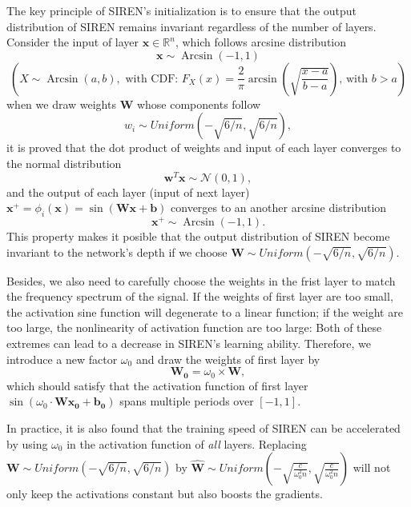 \documentclass{article}
\begin{document}
The key principle of SIREN's initialization is to ensure that the output distribution of SIREN remains invariant regardless of the number of layers.
Consider the input of layer $\mathbf{x} \in \mathbb{R}^n$, which follows arcsine distribution
$$\mathbf{x}  \sim \operatorname{Arcsin}(-1,1)$$
$$(
X \sim \operatorname{Arcsin}(a, b), \text { with CDF: } F_X(x)=\frac{2}{\pi} \arcsin \left(\sqrt{\frac{x-a}{b-a}}\right) \text {, with } b>a
)$$
when we draw weights $\mathbf{W}$ whose components follow 
$$
w_i \sim Uniform (-\sqrt{6/n}, \sqrt{6/n}),
$$
it is proved that the dot product of weights and input of each layer converges to the normal distribution 
$$
\mathbf{w}^T \mathbf{x} \sim \mathcal{N}\left(0, 1\right),
$$
and the output of each layer (input of next layer) $\mathbf{x}^+=\phi_i\left(\mathbf{x}\right)=\sin \left(\mathbf{W} \mathbf{x}+\mathbf{b}\right)$ converges to an another arcsine distribution
$$\mathbf{x}^+  \sim \operatorname{Arcsin}(-1,1).$$
This property makes it posible that the output distribution of SIREN become invariant to the network's depth if we choose $\mathbf{W} \sim Uniform (-\sqrt{6/n}, \sqrt{6/n}).$


Besides, we also need to carefully choose the weights in the frist layer to match the frequency spectrum of the signal.
If the weights of first layer are too small, the activation sine function will degenerate to a linear function; if the weight are too large, the nonlinearity of activation function are too large:  Both of these extremes can lead to a decrease in SIREN's learning ability.
Therefore, we introduce a new factor $\omega_0$  and  draw the weights of first layer by
$$
\mathbf{W_0} = \omega_0 \times \mathbf{W},
$$
which should satisfy that the activation function of first layer $\sin \left(\omega_0 \cdot \mathbf{W} \mathbf{x_0}+\mathbf{b_0}\right)$ spans multiple periods over $[-1,1]$.

In practice, it is also found that the training speed of SIREN can be accelerated by using $\omega_0$ in the activation function of \textit{all} layers.
Replacing $\mathbf{W} \sim Uniform (-\sqrt{6/n}, \sqrt{6/n})$ by
$
\widehat {\mathbf{W}} \sim Uniform\left(-\sqrt{\frac{c}{\omega_0^2 n}}, \sqrt{\frac{c}{\omega_0^2 n}}\right)
$ 
will not only keep the activations constant but also boosts the gradients.


\end{document}
